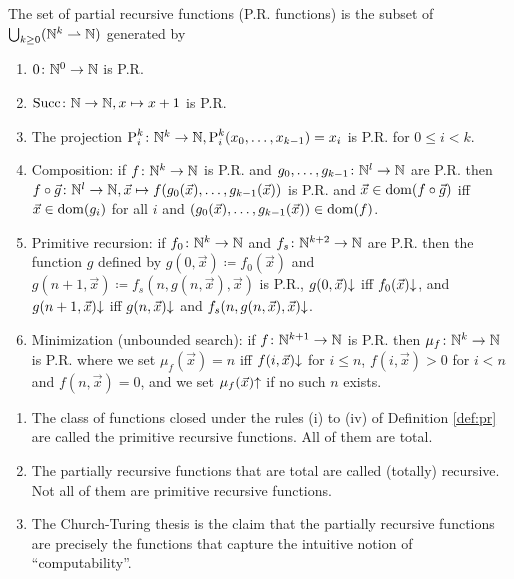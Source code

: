 \begin{boxdefi}\label{def:pr}
    The set of \alert{partial recursive functions (P.R. functions)} is the subset of $\bigcup_{k \ge 0}(\mathbb{N}^k \rightharpoonup \mathbb{N})$ generated by
    \begin{enumerate}
        \item $0 \colon \mathbb{N}^0 \to \mathbb{N}$ is P.R.
        \item $\text{Succ} \colon \mathbb{N} \to \mathbb{N}, x \mapsto x + 1$ is P.R.
        \item The projection $\text{P}_{i}^{k} \colon \mathbb{N}^k \to \mathbb{N},  \text{P}_{i}^{k}(x_0, \dots, x_{k-1}) = x_i$ is P.R. for $0 \le i < k$.
        \item Composition: if $f \colon \mathbb{N}^k \to \mathbb{N}$ is P.R. and $g_0, \dots, g_{k-1} \colon \mathbb{N}^l \to \mathbb{N}$ are P.R. then $f \circ \vec{g} \colon \mathbb{N}^l \to \mathbb{N}, \vec{x} \mapsto f(g_0(\vec{x}), \dots, g_{k-1}(\vec{x}))$ is P.R. and $\vec{x} \in \mathrm{dom}(f \circ \vec{g})$ iff $\vec{x} \in \mathrm{dom}(g_i)$ for all $i$ and $(g_0(\vec{x}), \dots, g_{k-1}(\vec{x})) \in \mathrm{dom}(f)$.
    \item Primitive recursion: if $f_0 \colon \mathbb{N}^k \to \mathbb{N}$ and $f_s \colon \mathbb{N}^{k+2} \to \mathbb{N}$ are P.R. then the function $g$ defined by $g(0, \vec{x}) \coloneq f_0(\vec{x})$ and $g(n+1, \vec{x}) \coloneq f_s(n, g(n, \vec{x}), \vec{x})$ is P.R., $g(0, \vec{x}){\downarrow}$ iff $f_0(\vec{x}){\downarrow}$, and $g(n + 1, \vec{x}){\downarrow}$ iff $g(n, \vec{x}){\downarrow}$ and $f_s(n, g(n, \vec{x}), \vec{x}){\downarrow}$.
    \item Minimization (unbounded search): if $f \colon \mathbb{N}^{k + 1} \to \mathbb{N}$ is P.R. then $\mu_f \colon \mathbb{N}^k \to \mathbb{N}$ is P.R. where we set $\mu_f(\vec{x}) = n$ iff $f(i, \vec{x}){\downarrow}$ for $i \le n$, $f(i, \vec{x}) > 0$ for $i < n$ and $f(n, \vec{x}) = 0$, and we set $\mu_f(\vec{x}){\uparrow}$ if no such $n$ exists.
    \end{enumerate}
\end{boxdefi}

\begin{rem}
    \hfill
    \begin{enumerate}
        \item The class of functions closed under the rules (i) to (iv) of Definition \ref{def:pr} are called the \alert{primitive recursive functions}. All  of them are total.
        \item The partially recursive functions that are total are called \alert{(totally) recursive}. Not all of them are primitive recursive functions.
        \item The Church-Turing thesis is the claim that the partially recursive functions are precisely the functions that capture the intuitive notion of ``computability''.
    \end{enumerate}
\end{rem}

